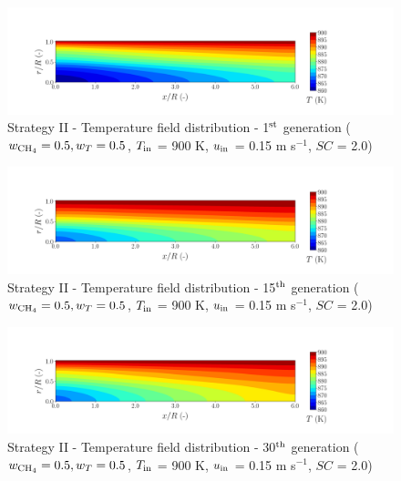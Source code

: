 \documentclass[preprint,12pt]{elsarticle}
\begin{document}
\begin{figure}[h!]
\centering
\includegraphics[width=190mm]{results/5Eq/50C_50T/GEN1-TFIELD.png}
\caption{\label{fig:5RES5050G1-TField} Strategy II - Temperature field distribution - 1$^{\rm{st}}$ generation ($w_{\rm{CH_4}} = 0.5, w_T = 0.5$, $T_{\rm{in}}$ = 900 K, $u_{\rm{in}}$ = 0.15 m s$^{-1}$, $SC$ = 2.0)}
\end{figure}

\begin{figure}[h!]
\centering
\includegraphics[width=190mm]{results/5Eq/50C_50T/GEN15-TFIELD.png}
\caption{\label{fig:5RES5050G15-TField} Strategy II - Temperature field distribution - 15$^{\rm{th}}$ generation ($w_{\rm{CH_4}} = 0.5, w_T = 0.5$, $T_{\rm{in}}$ = 900 K, $u_{\rm{in}}$ = 0.15 m s$^{-1}$, $SC$ = 2.0)}
\end{figure}

\begin{figure}[h!]
\centering
\includegraphics[width=190mm]{results/5Eq/50C_50T/GEN30-TFIELD.png}
\caption{\label{fig:5RES5050G30-TField} Strategy II - Temperature field distribution - 30$^{\rm{th}}$ generation ($w_{\rm{CH_4}} = 0.5, w_T = 0.5$, $T_{\rm{in}}$ = 900 K, $u_{\rm{in}}$ = 0.15 m s$^{-1}$, $SC$ = 2.0)}
\end{figure}
\end{document}

